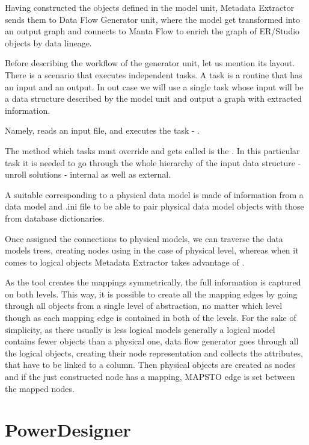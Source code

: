 Having constructed the objects defined in the model unit, Metadata Extractor sends them to Data Flow Generator unit, where the model get transformed into an output graph and connects to Manta Flow to enrich the graph of ER/Studio objects by data lineage.

Before describing the workflow of the generator unit, let us mention its layout.
There is a scenario that executes independent tasks. A task is a routine that has an input and an output. In out case we will use a single task whose input will be a data structure described by the model unit and output a graph with extracted information.

 Namely,  reads an input file, and executes the task - . 
 
 The method which tasks must override and gets called is the . In this particular task it is needed to go through the whole hierarchy of the input data structure -  unroll solutions - internal as well as external.

A suitable  corresponding to a physical data model is made of information from a data model and .ini file to be able to pair physical data model objects with those from database dictionaries.

Once assigned the connections to physical models, we can traverse the data models trees, creating nodes using  in the case of physical level, whereas when it comes to logical objects Metadata Extractor takes advantage of .

As the tool creates the mappings symmetrically, the full information is captured on both levels. This way, it is possible to create all the mapping edges by going through all objects from a single level of abstraction, no matter which level though as each mapping edge is contained in both of the levels.
For the sake of simplicity, as there usually is less logical models generally a logical model contains fewer objects than a physical one, data flow generator goes through all the logical objects, creating their node representation and collects the attributes, that have to be linked to a column.
Then physical objects are created as nodes and if the just constructed node has a mapping, MAPS\textunderscore TO edge is set between the mapped nodes.


\section{PowerDesigner}

